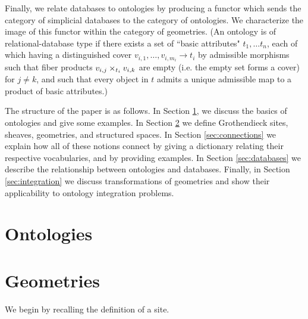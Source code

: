 \documentclass{amsart}
\begin{document}
Finally, we relate databases to ontologies by producing a functor which sends the category of simplicial databases \cite{Spi} to the category of ontologies.  We characterize the image of this functor within the category of geometries.  (An ontology is of relational-database type if there exists a set of ``basic attributes" $t_1,\ldots t_n$, each of which having a distinguished cover $v_{i,1},\ldots,v_{i,m_i}\to t_i$ by admissible morphisms such that fiber products $v_{i,j}\times_{t_i}v_{i,k}$ are empty (i.e. the empty set forms a cover) for $j\neq k$, and such that every object in $t$ admits a unique admissible map to a product of basic attributes.)

The structure of the paper is as follows.  In Section \ref{sec:ontologies}, we discuss the basics of ontologies and give some examples.  In Section \ref{sec:geometries} we define Grothendieck sites, sheaves, geometries, and structured spaces.  In Section \ref{sec:connections} we explain how all of these notions connect by giving a dictionary relating their respective vocabularies, and by providing examples.  In Section \ref{sec:databases} we describe the relationship between ontologies and databases.  Finally, in Section \ref{sec:integration} we discuss transformations of geometries and show their applicability to ontology integration problems.

\section{Ontologies}\label{sec:ontologies}

\section{Geometries}\label{sec:geometries}

We begin by recalling the definition of a site.
\end{document}
